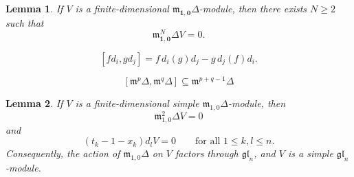 \documentclass[10pt,a4paper]{amsart}
\newtheorem{lemma}{Lemma}
\def\b1{\mathbf{1}}
\def\bo{\mathbf{0}}
\def\mm{\mathfrak{m}}
\begin{document}
\begin{lemma}\label{lem:finite-jet}
If \(V\) is a finite-dimensional \(\mathfrak m_{\b1,\bo}\Delta\)-module, then
there exists \(N\geq 2\) such that
\[
\mm_{\b1,\bo}^N\Delta V=0.
\]
\end{lemma}

\begin{equation}\label{eq:basic-vector-field-bracket}
[fd_i,gd_j]
 =
 f\,d_i(g)d_j-g\,d_j(f)d_i.
\end{equation}

\begin{equation}\label{eq:filtration-bracket}
[\mathfrak m^p\Delta,\mathfrak m^q\Delta]
\subseteq
\mathfrak m^{p+q-1}\Delta
\end{equation}

\begin{lemma}\label{lem:gln-quotient}
If \(V\) is a finite-dimensional simple
\(\mathfrak m_{1,0}\Delta\)-module, then
\[
\mathfrak m_{1,0}^{2}\Delta V=0
\]
and
\[
(t_k-1-x_k)d_lV=0
\qquad
\text{for all }1\leq k,l\leq n.
\]
Consequently, the action of \(\mathfrak m_{1,0}\Delta\) on \(V\)
factors through \(\mathfrak{gl}_n\), and \(V\) is a simple
\(\mathfrak{gl}_n\)-module.
\end{lemma}
\end{document}
